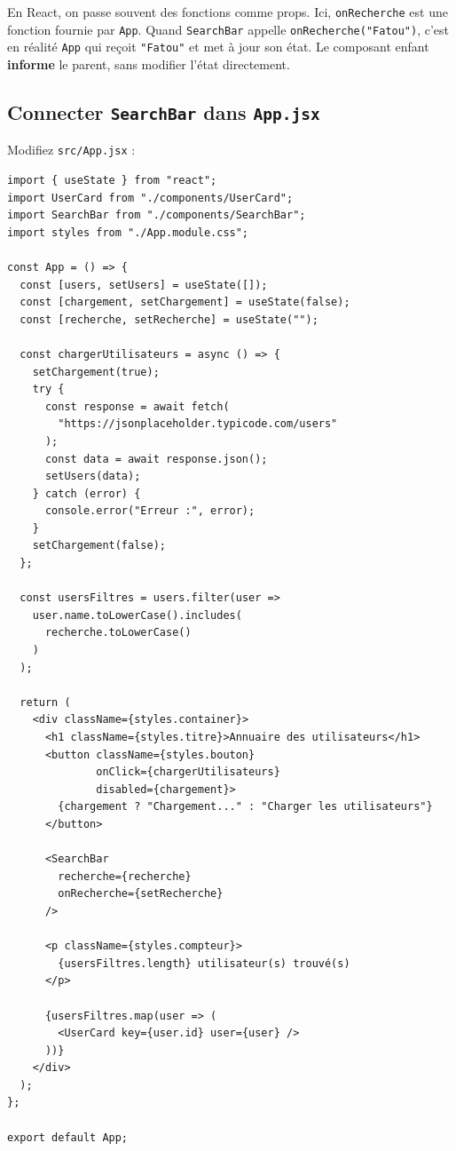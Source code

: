 \documentclass[11pt,a4paper]{article}
\begin{document}
\begin{attentionbox}
En React, on passe souvent des fonctions comme props. Ici, \texttt{onRecherche} est une fonction fournie par \texttt{App}. Quand \texttt{SearchBar} appelle \texttt{onRecherche("Fatou")}, c'est en réalité \texttt{App} qui reçoit \texttt{"Fatou"} et met à jour son état. Le composant enfant \textbf{informe} le parent, sans modifier l'état directement.
\end{attentionbox}

\subsection{Connecter \texttt{SearchBar} dans \texttt{App.jsx}}

Modifiez \texttt{src/App.jsx} :

\begin{lstlisting}
import { useState } from "react";
import UserCard from "./components/UserCard";
import SearchBar from "./components/SearchBar";
import styles from "./App.module.css";

const App = () => {
  const [users, setUsers] = useState([]);
  const [chargement, setChargement] = useState(false);
  const [recherche, setRecherche] = useState("");

  const chargerUtilisateurs = async () => {
    setChargement(true);
    try {
      const response = await fetch(
        "https://jsonplaceholder.typicode.com/users"
      );
      const data = await response.json();
      setUsers(data);
    } catch (error) {
      console.error("Erreur :", error);
    }
    setChargement(false);
  };

  const usersFiltres = users.filter(user =>
    user.name.toLowerCase().includes(
      recherche.toLowerCase()
    )
  );

  return (
    <div className={styles.container}>
      <h1 className={styles.titre}>Annuaire des utilisateurs</h1>
      <button className={styles.bouton}
              onClick={chargerUtilisateurs}
              disabled={chargement}>
        {chargement ? "Chargement..." : "Charger les utilisateurs"}
      </button>

      <SearchBar
        recherche={recherche}
        onRecherche={setRecherche}
      />

      <p className={styles.compteur}>
        {usersFiltres.length} utilisateur(s) trouvé(s)
      </p>

      {usersFiltres.map(user => (
        <UserCard key={user.id} user={user} />
      ))}
    </div>
  );
};

export default App;
\end{lstlisting}
\end{document}
